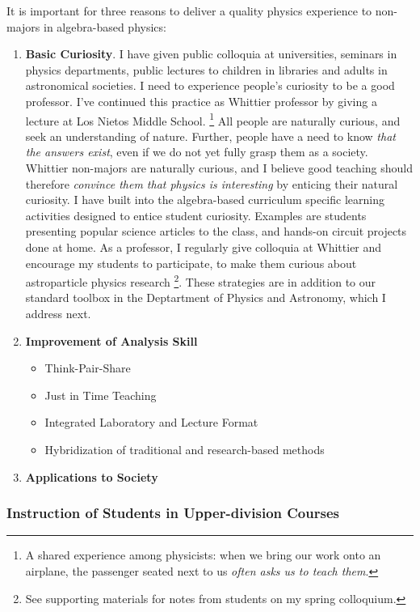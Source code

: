 \documentclass[../../main.tex]{subfiles}
\begin{document}
It is important for three reasons to deliver a quality physics experience to non-majors in algebra-based physics:
\begin{enumerate}
\item \textbf{Basic Curiosity}.  I have given public colloquia at universities, seminars in physics departments, public lectures to children in libraries and adults in astronomical societies.  I need to experience people's curiosity to be a good professor.  I've continued this practice as Whittier professor by giving a lecture at Los Nietos Middle School.  \footnote{A shared experience among physicists: when we bring our work onto an airplane, the passenger seated next to us \textit{often asks us to teach them}.}  All people are naturally curious, and seek an understanding of nature.  Further, people have a need to know \textit{that the answers exist}, even if we do not yet fully grasp them as a society.  Whittier non-majors are naturally curious, and I believe good teaching should therefore \textit{convince them that physics is interesting} by enticing their natural curiosity.  I have built into the algebra-based curriculum specific learning activities designed to entice student curiosity.  Examples are students presenting popular science articles to the class, and hands-on circuit projects done at home.  As a professor, I regularly give colloquia at Whittier and encourage my students to participate, to make them curious about astroparticle physics research \footnote{See supporting materials for notes from students on my spring colloquium.}.  These strategies are in addition to our standard toolbox in the Deptartment of Physics and Astronomy, which I address next.
\item \textbf{Improvement of Analysis Skill}
\begin{itemize}
\item Think-Pair-Share
\item Just in Time Teaching
\item Integrated Laboratory and Lecture Format
\item Hybridization of traditional and research-based methods
\end{itemize}
\item \textbf{Applications to Society}
\end{enumerate}

\subsubsection{Instruction of Students in Upper-division Courses}
\end{document}
